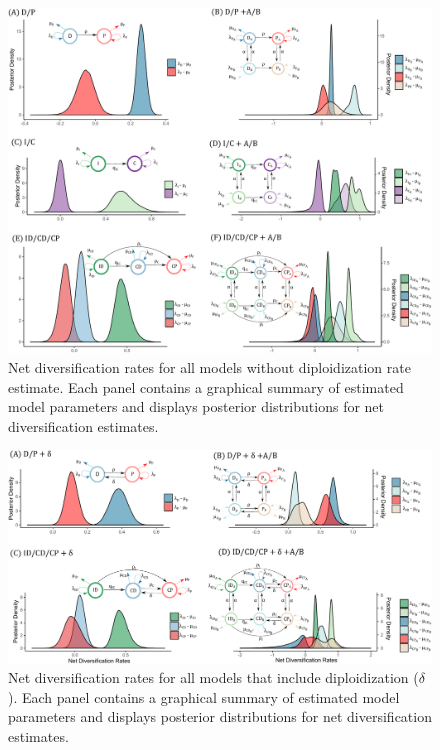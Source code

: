 
\begin{figure}
\includegraphics[width=\textwidth]{allnetdivmodelswithoutdelta.pdf} %
\caption{Net diversification rates for all models without diploidization rate estimate. 
Each panel contains a graphical summary of estimated model parameters and displays posterior distributions for net diversification estimates.}
\label{figure:netdivall}
\end{figure}

\begin{figure}
\includegraphics[width=\textwidth]{allnetdivmodelsdiploidization.pdf}
\caption{Net diversification rates for all models that include diploidization ($\delta$). 
Each panel contains a graphical summary of estimated model parameters and displays posterior distributions for net diversification estimates.}  
\label{figure:netdivnodip}
\end{figure}

